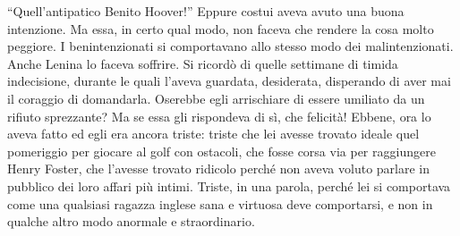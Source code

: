 \documentclass[
a5paper, %
10pt, %
twoside, 
onecolumn, %
openany, %
]{memoir}
\begin{document}
“Quell’antipatico Benito Hoover!” Eppure costui aveva avuto una buona intenzione. Ma essa, in certo qual modo, non faceva che rendere la cosa molto peggiore. I benintenzionati si comportavano allo stesso modo dei malintenzionati. Anche Lenina lo faceva soffrire. Si ricordò di quelle settimane di timida indecisione, durante le quali l’aveva guardata, desiderata, disperando di aver mai il coraggio di domandarla. Oserebbe egli arrischiare di essere umiliato da un rifiuto sprezzante? Ma se essa gli rispondeva di sì, che felicità! Ebbene, ora lo aveva fatto ed egli era ancora triste: triste che lei avesse trovato ideale quel pomeriggio per giocare al golf con ostacoli, che fosse corsa via per raggiungere Henry Foster, che l’avesse trovato ridicolo perché non aveva voluto parlare in pubblico dei loro affari più intimi. Triste, in una parola, perché lei si comportava come una qualsiasi ragazza inglese sana e virtuosa deve comportarsi, e non in qualche altro modo anormale e straordinario.
\end{document}
